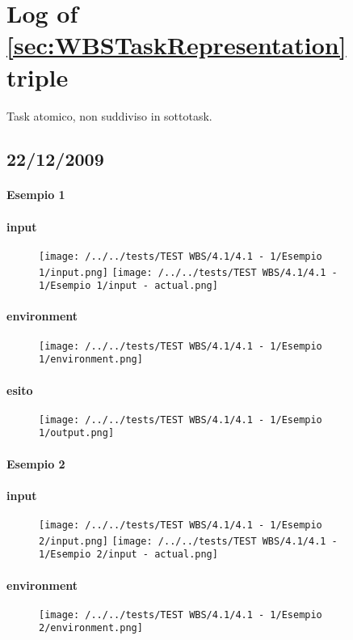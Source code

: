 \section{Log of \ref{sec:WBSTaskRepresentation} triple}

Task atomico, non suddiviso in sottotask.
\subsection{22/12/2009}
\paragraph{Esempio 1}
\paragraph{input}
\begin{figure}
\centering
\texttt{[image: /../../tests/TEST WBS/4.1/4.1 - 1/Esempio 1/input.png]}
\texttt{[image: /../../tests/TEST WBS/4.1/4.1 - 1/Esempio 1/input - actual.png]}
\end{figure}
\paragraph{environment}
\begin{figure}
\centering
\texttt{[image: /../../tests/TEST WBS/4.1/4.1 - 1/Esempio 1/environment.png]}
\end{figure}
\paragraph{esito}
\begin{figure}
\centering
\texttt{[image: /../../tests/TEST WBS/4.1/4.1 - 1/Esempio 1/output.png]}
\end{figure}

\paragraph{Esempio 2}
\paragraph{input}
\begin{figure}
\centering
\texttt{[image: /../../tests/TEST WBS/4.1/4.1 - 1/Esempio 2/input.png]}
\texttt{[image: /../../tests/TEST WBS/4.1/4.1 - 1/Esempio 2/input - actual.png]}
\end{figure}
\paragraph{environment}
\begin{figure}
\centering
\texttt{[image: /../../tests/TEST WBS/4.1/4.1 - 1/Esempio 2/environment.png]}
\end{figure}
